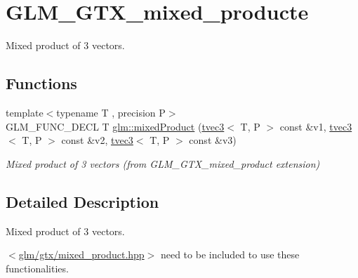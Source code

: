 \hypertarget{group__gtx__mixed__product}{}\section{G\+L\+M\+\_\+\+G\+T\+X\+\_\+mixed\+\_\+producte}
\label{group__gtx__mixed__product}


Mixed product of 3 vectors.  


\subsection*{Functions}
\begin{DoxyCompactItemize}
\item 
\mbox{\label{group__gtx__mixed__product_gaaee4cf80d69cb86de80f12af88b3c3af}} 
{\footnotesize template$<$typename T , precision P$>$ }\\G\+L\+M\+\_\+\+F\+U\+N\+C\+\_\+\+D\+E\+CL T \hyperlink{group__gtx__mixed__product_gaaee4cf80d69cb86de80f12af88b3c3af}{glm\+::mixed\+Product} (\hyperlink{structglm_1_1tvec3}{tvec3}$<$ T, P $>$ const \&v1, \hyperlink{structglm_1_1tvec3}{tvec3}$<$ T, P $>$ const \&v2, \hyperlink{structglm_1_1tvec3}{tvec3}$<$ T, P $>$ const \&v3)
\begin{DoxyCompactList}\small\item\em Mixed product of 3 vectors (from G\+L\+M\+\_\+\+G\+T\+X\+\_\+mixed\+\_\+product extension) \end{DoxyCompactList}\end{DoxyCompactItemize}


\subsection{Detailed Description}
Mixed product of 3 vectors. 

$<$\hyperlink{mixed__product_8hpp}{glm/gtx/mixed\+\_\+product.\+hpp}$>$ need to be included to use these functionalities. 